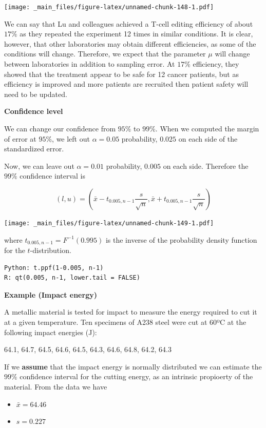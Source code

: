 \documentclass[
]{book}
\providecommand{\tightlist}{%
  \setlength{\itemsep}{0pt}\setlength{\parskip}{0pt}}
\begin{document}
\texttt{[image: \_main\_files/figure-latex/unnamed-chunk-148-1.pdf]}

We can say that Lu and colleagues achieved a T-cell editing efficiency of about \(17\%\) as they repeated the experiment 12 times in similar conditions. It is clear, however, that other laboratories may obtain different efficiencies, as some of the conditions will change. Therefore, we expect that the parameter \(\mu\) will change between laboratories in addition to sampling error. At \(17\%\) efficiency, they showed that the treatment appear to be safe for 12 cancer patients, but as efficiency is improved and more patients are recruited then patient safety will need to be updated.

\textbf{Confidence level}

We can change our confidence from \(95\%\) to \(99\%\). When we computed the margin of error at \(95\%\), we left out \(\alpha=0.05\) probability, \(0.025\) on each side of the standardized error.

Now, we can leave out \(\alpha=0.01\) probability, \(0.005\) on each side. Therefore the \(99\%\) confidence interval is

\[(l,u) = (\bar{x} - t_{0.005, n-1}\frac{s}{\sqrt{n}},\bar{x} +  t_{0.005, n-1}\frac{s}{\sqrt{n}})\]

\texttt{[image: \_main\_files/figure-latex/unnamed-chunk-149-1.pdf]}

where \(t_{0.005, n-1}=F^{-1}(0.995)\) is the inverse of the probability density function for the \(t\)-distribution.

\begin{verbatim}
Python: t.ppf(1-0.005, n-1) 
R: qt(0.005, n-1, lower.tail = FALSE)
\end{verbatim}

\textbf{Example (Impact energy)}

A metallic material is tested for impact to measure the energy required to cut it at a given temperature. Ten specimens of A238 steel were cut at 60ºC at the following impact energies (J):

64.1, 64.7, 64.5, 64.6, 64.5, 64.3, 64.6, 64.8, 64.2, 64.3

If we \textbf{assume} that the impact energy is normally distributed we can estimate the \(99\%\) confidence interval for the cutting energy, as an intrinsic propioerty of the material. From the data we have

\begin{itemize}
\tightlist
\item
  \(\bar{x}=64.46\)
\item
  \(s=0.227\)
\end{itemize}
\end{document}
